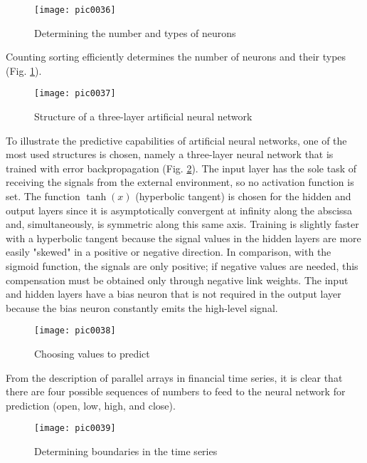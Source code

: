 \begin{figure}[h]
\centering
\texttt{[image: pic0036]}
\caption{Determining the number and types of neurons}
\label{fig:pic0036}
\end{figure}
\FloatBarrier

Counting sorting efficiently determines the number of neurons and their types (Fig. \ref{fig:pic0036}).

\begin{figure}[h]
\centering
\texttt{[image: pic0037]}
\caption{Structure of a three-layer artificial neural network}
\label{fig:pic0037}
\end{figure}
\FloatBarrier

To illustrate the predictive capabilities of artificial neural networks, one of the most used structures is chosen, namely a three-layer neural network that is trained with error backpropagation (Fig. \ref{fig:pic0037}). The input layer has the sole task of receiving the signals from the external environment, so no activation function is set. The function $\tanh( x )$ (hyperbolic tangent) is chosen for the hidden and output layers since it is asymptotically convergent at infinity along the abscissa and, simultaneously, is symmetric along this same axis. Training is slightly faster with a hyperbolic tangent because the signal values in the hidden layers are more easily "skewed" in a positive or negative direction. In comparison, with the sigmoid function, the signals are only positive; if negative values are needed, this compensation must be obtained only through negative link weights. The input and hidden layers have a bias neuron that is not required in the output layer because the bias neuron constantly emits the high-level signal.

\begin{figure}[h]
\centering
\texttt{[image: pic0038]}
\caption{Choosing values to predict}
\label{fig:pic0038}
\end{figure}
\FloatBarrier

From the description of parallel arrays in financial time series, it is clear that there are four possible sequences of numbers to feed to the neural network for prediction (open, low, high, and close).

\begin{figure}[h]
\centering
\texttt{[image: pic0039]}
\caption{Determining boundaries in the time series}
\label{fig:pic0039}
\end{figure}
\FloatBarrier

